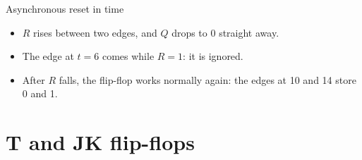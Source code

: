 \documentclass[10pt]{wosm-slides}
\newcommand*\clockedges[1]{\foreach \t in {2,6,10,14} {\timingedge{\t}{#1}}}
\begin{document}
\begin{frame}{Asynchronous reset in time}
  \begin{center}
  \end{center}

  \begin{itemize}
    \item $R$ rises between two edges, and $Q$ drops to 0 straight away.
    \item The edge at $t = 6$ comes while $R = 1$: it is ignored.
    \item After $R$ falls, the flip-flop works normally again: the edges at 10 and 14
      store 0 and 1.
  \end{itemize}
\end{frame}

\section{T and JK flip-flops}
\end{document}
